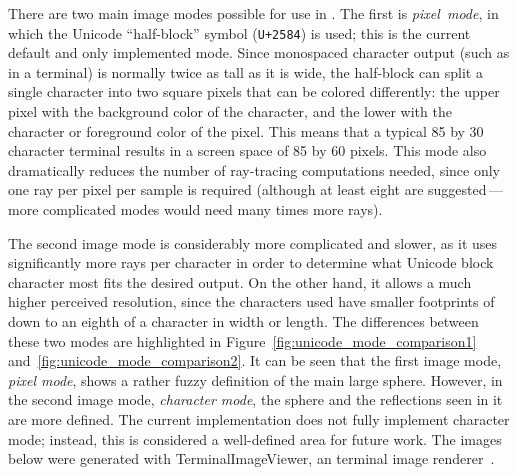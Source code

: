 There are two main image modes possible for use in \name{}.
The first is {\it pixel~mode}, in which the Unicode ``half-block'' symbol (\texttt{U+2584}) is used; this is the current default and only implemented mode.
Since monospaced character output (such as in a terminal) is normally twice as tall as it is wide, the half-block can split a single character into two square pixels that can be colored differently: the upper pixel with the background color of the character, and the lower with the character or foreground color of the pixel.
This means that a typical 85 by 30 character terminal results in a screen space of 85 by 60 pixels.
This mode also dramatically reduces the number of ray-tracing computations needed, since only one ray per pixel per sample is required (although at least eight are suggested\,---\,more complicated modes would need many times more rays).

The second image mode is considerably more complicated and slower, as it uses significantly more rays per character in order to determine what Unicode block character most fits the desired output.
On the other hand, it allows a much higher perceived resolution, since the characters used have smaller footprints of down to an eighth of a character in width or length.
The differences between these two modes are highlighted in Figure~\ref{fig:unicode_mode_comparison1} and~\ref{fig:unicode_mode_comparison2}.
It can be seen that the first image mode, {\it pixel mode}, shows a rather fuzzy definition of the main large sphere.
However, in the second image mode, {\it character mode}, the sphere and the reflections seen in it are more defined.
The current implementation does not fully implement character mode; instead, this is considered a well-defined area for future work.
The images below were generated with TerminalImageViewer, an terminal image renderer~\cite{tivGithub}.

